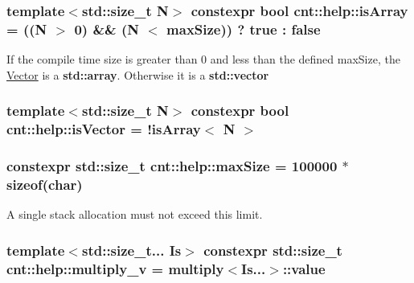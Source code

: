 \subsubsection[{\texorpdfstring{is\+Array}{isArray}}]{\setlength{\rightskip}{0pt plus 5cm}template$<$std\+::size\+\_\+t N$>$ constexpr bool cnt\+::help\+::is\+Array = ((N $>$ 0) \&\& (N $<$ {\bf max\+Size})) ? true \+: false}\hypertarget{namespacecnt_1_1help_aa31a937cfd47ea6364195d39394f8fde}{}\label{namespacecnt_1_1help_aa31a937cfd47ea6364195d39394f8fde}
If the compile time size is greater than 0 and less than the defined max\+Size, the \hyperlink{structcnt_1_1Vector}{Vector} is a {\bf std\+::array}. Otherwise it is a {\bf std\+::vector} 
\subsubsection[{\texorpdfstring{is\+Vector}{isVector}}]{\setlength{\rightskip}{0pt plus 5cm}template$<$std\+::size\+\_\+t N$>$ constexpr bool cnt\+::help\+::is\+Vector = !{\bf is\+Array}$<$ N $>$}\hypertarget{namespacecnt_1_1help_a5d40a2583c5a58f9f4540ef0518296d5}{}\label{namespacecnt_1_1help_a5d40a2583c5a58f9f4540ef0518296d5}
\subsubsection[{\texorpdfstring{max\+Size}{maxSize}}]{\setlength{\rightskip}{0pt plus 5cm}constexpr {\bf std\+::size\+\_\+t} cnt\+::help\+::max\+Size = 100000 $\ast$ sizeof(char)}\hypertarget{namespacecnt_1_1help_a0f05823dbd2465382e7961e1b69e5f51}{}\label{namespacecnt_1_1help_a0f05823dbd2465382e7961e1b69e5f51}


A single stack allocation must not exceed this limit. 

\subsubsection[{\texorpdfstring{multiply\+\_\+v}{multiply_v}}]{\setlength{\rightskip}{0pt plus 5cm}template$<$std\+::size\+\_\+t... Is$>$ constexpr {\bf std\+::size\+\_\+t} cnt\+::help\+::multiply\+\_\+v = {\bf multiply}$<$Is...$>$\+::value}\hypertarget{namespacecnt_1_1help_ab018f6aa5c1016ecf5d0d825cf8d362f}{}\label{namespacecnt_1_1help_ab018f6aa5c1016ecf5d0d825cf8d362f}
